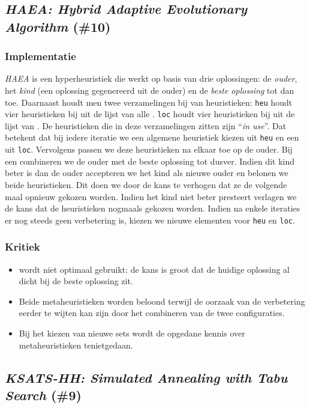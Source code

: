 \subsection{\emph{HAEA: Hybrid Adaptive Evolutionary Algorithm} (\#10)}
\label{sss:haea}
\subsubsection{Implementatie}
\emph{HAEA}\cite{chesc-haea,Gomez04selfadaptation} is een hyperheuristiek die werkt op basis van drie oplossingen: de \emph{ouder}, het \emph{kind} (een oplossing gegenereerd uit de ouder) en de \emph{beste oplossing} tot dan toe. Daarnaast houdt men twee verzamelingen bij van heuristieken: \texttt{heu} houdt vier heuristieken bij uit de lijst van alle \abllhn{}. \texttt{loc} houdt vier heuristieken bij uit de lijst van \abls{} \abllhn{}. De heuristieken die in deze verzamelingen zitten zijn ``\emph{in use}''. Dat betekent dat bij iedere iteratie we een algemene heuristiek kiezen uit \texttt{heu} en een \abls{} \abllh{} uit \texttt{loc}. Vervolgens passen we deze heuristieken na elkaar toe op  de ouder. Bij een \abco{} \abllh{} combineren we de ouder met de beste oplossing tot dusver. Indien dit kind beter is dan de ouder accepteren we het kind als nieuwe ouder en belonen we beide heuristieken. Dit doen we door de kans te verhogen dat ze de volgende maal opnieuw gekozen worden. Indien het kind niet beter presteert verlagen we de kans dat de heuristieken nogmaals gekozen worden. Indien na enkele iteraties er nog steeds geen verbetering is, kiezen we nieuwe elementen voor \texttt{heu} en \texttt{loc}.
\subsubsection{Kritiek}
\begin{itemize}
 \item \abco[C]{} wordt niet optimaal gebruikt: de kans is groot dat de huidige oplossing al dicht bij de beste oplossing zit.
 \item Beide metaheuristieken worden beloond terwijl de oorzaak van de verbetering eerder te wijten kan zijn door het combineren van de twee configuraties.
 \item Bij het kiezen van nieuwe sets wordt de opgedane kennis over metaheuristieken tenietgedaan.
\end{itemize}
\subsection{\emph{KSATS-HH: Simulated Annealing with Tabu Search} (\#9)}
\label{sss:ksats-hh}
